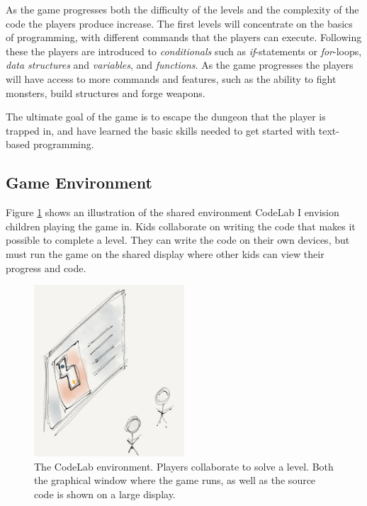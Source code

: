 \documentclass[12pt,journal,compsoc, a4paper, onecolumn]{IEEEtran}
\begin{document}
As the game progresses both the difficulty of the levels and the complexity of
the code the players produce increase. The first levels will concentrate on the
basics of programming, with different commands that the players can execute.
Following these the players are introduced to \emph{conditionals} such as
\emph{if}-statements or \emph{for}-loops, \emph{data structures} and
\emph{variables}, and \emph{functions}. As the game progresses the players will
have access to more commands and features, such as the ability to fight
monsters, build structures and forge weapons. 

The ultimate goal of the game is to escape the dungeon that the player is
trapped in, and have learned the basic skills needed to get started with
text-based programming. 

\subsection{Game Environment} 
Figure \ref{fig:environ} shows an illustration of the shared environment CodeLab
I envision children playing the game in. Kids collaborate on writing the code
that makes it possible to complete a level. They can write the code on their own
devices, but must run the game on the shared display where other kids can view
their progress and code. 

\begin{figure}[htb!]
    \begin{centering}
    \includegraphics[width=0.5\textwidth]{./figures/codelab2.png}
    \caption{The CodeLab environment. Players collaborate to solve a level. Both
    the graphical window where the game runs, as well as the source code is
    shown on a large display. } 
    \label{fig:environ}
    \end{centering} 
\end{figure}
\end{document}
